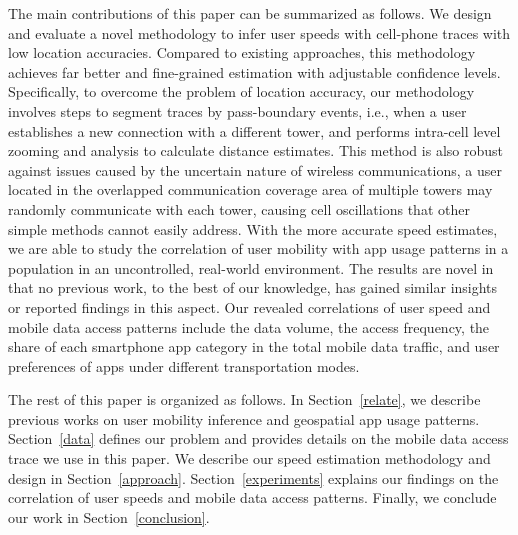 The main contributions of this paper can be summarized as follows.
We design and evaluate a novel methodology to infer user speeds with cell-phone traces with low location accuracies. Compared to existing approaches, this methodology achieves far better and fine-grained estimation with adjustable confidence levels. Specifically, to overcome the problem of location accuracy, our methodology involves steps to segment traces by pass-boundary events, i.e., when a user establishes a new connection with a different tower, and performs intra-cell level zooming and analysis to calculate distance estimates. This method is also robust against issues caused by the uncertain nature of wireless communications, \eg a user located in the overlapped communication coverage area of multiple towers may randomly communicate with each tower, causing cell oscillations that other simple methods cannot easily address.
With the more accurate speed estimates, we are able to study the correlation of user mobility with app usage patterns in a population in an uncontrolled, real-world environment. The results are novel in that no previous work, to the best of our knowledge, has gained similar insights or reported findings in this aspect. Our revealed correlations of user speed and mobile data access patterns include the data volume, the access frequency, the share of each smartphone app category in the total mobile data traffic, and user preferences of apps under different transportation modes.

The rest of this paper is organized as follows.
In Section~\ref{relate}, we describe previous works on user mobility inference and geospatial app usage patterns.
Section~\ref{data} defines our problem and provides details on the mobile data access trace we use in this paper.
We describe our speed estimation methodology and design in Section~\ref{approach}.
Section~\ref{experiments} explains our findings on the correlation of user speeds and mobile data access patterns.
Finally, we conclude our work in Section~\ref{conclusion}.


